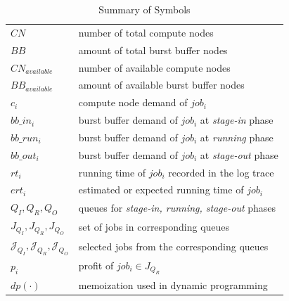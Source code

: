 

\begin{table}[ht] 
        \renewcommand{\arraystretch}{1.3}
        \caption{Summary of Symbols}
        \label{Tab:Symbols}
        \centering
        \begin{tabular}{l|l}
                \hline
                $CN$ & number of total compute nodes \\
                $BB$ & amount of total burst buffer nodes \\
                $CN_{available}$ & number of available compute nodes \\
                $BB_{available}$ & amount of available burst buffer nodes \\
                $c_i$ & compute node demand of $job_i$ \\
                $bb\_in_i$ & burst buffer demand of $job_i$ at \textit{stage-in} phase \\
                $bb\_run_i$ & burst buffer demand of $job_i$ at \textit{running} phase \\
                $bb\_out_i$ & burst buffer demand of $job_i$ at \textit{stage-out} phase \\
                $rt_i$ & running time of $job_i$ recorded in the log trace \\
                $ert_i$ & estimated or expected running time of $job_i$ \\
                $Q_I, Q_R, Q_O$ & queues for \textit{stage-in, running, stage-out} phases \\
                $J_{Q_I}, J_{Q_R}, J_{Q_O}$ & set of jobs in corresponding queues \\
                $\mathcal{J}_{Q_I}, \mathcal{J}_{Q_R}, \mathcal{J}_{Q_O}$ & selected jobs from the corresponding queues\\
                $p_i$ & profit of $job_i \in J_{Q_R}$ \\
                $dp(\cdot)$ & memoization used in dynamic programming \\
                \hline
        \end{tabular}
\end{table}

